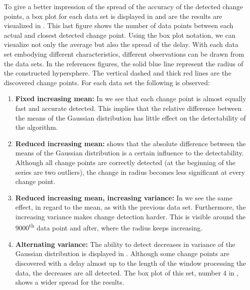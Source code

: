 To give a better impression of the spread of the accuracy of the detected change points, a box plot for each data set is displayed in  and are the results are visualized in .
This last figure shows the number of data points between each actual and closest detected change point.
Using the box plot notation, we can visualize not only the average but also the spread of the delay.
With each data set embodying different characteristics, different observations can be drawn from the data sets.
In the references figures, the solid blue line represent the radius of the constructed hypersphere.
The vertical dashed and thick red lines are the discovered change points.
For each data set the following is observed:
\begin{enumerate}
  \item \textbf{Fixed increasing mean:} In  we see that each change point is almost equally fast and accurate detected.
  This implies that the relative difference between the means of the Gaussian distribution has little effect on the detectability of the algorithm.
  \item \textbf{Reduced increasing mean:}  shows that the absolute difference between the means of the Gaussian distribution is a certain influence to the detectability.
  Although all change points are correctly detected (at the beginning of the series are two outliers), the change in radius becomes less significant at every change point.
  \item \textbf{Reduced increasing mean, increasing variance:} In  we see the same effect, in regard to the mean, as with the previous data set.
  Furthermore, the increasing variance makes change detection harder.
  This is visible around the $9000$\textsuperscript{th} data point and after, where the radius keeps increasing.
  \item \textbf{Alternating variance:} The ability to detect decreases in variance of the Gaussian distribution is displayed in .
  Although some change points are discovered with a delay almost up to the length of the window processing the data, the decreases are all detected.
  The box plot of this set, number 4 in , shows a wider spread for the results.
\end{enumerate}


